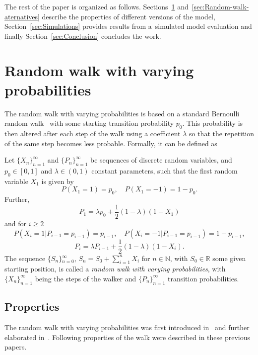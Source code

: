 The rest of the paper is organized as follows.
Sections~\ref{sec:Random-walk-with}
and~\ref{sec:Random-walk-aternatives}
describe the properties of different versions of the model,
Section~\ref{sec:Simulations} provides results from a~simulated
model evaluation and finally Section~\ref{sec:Conclusion} concludes
the work.


\section{Random walk with varying probabilities}\label{sec:Random-walk-with}

The random walk with varying probabilities is based on a standard
Bernoulli random walk~\cite{feller1957introduction} with some starting
transition probability $p_{0}$.
This probability is then altered
after each step of the walk using a coefficient $\lambda$ so that
the repetition of the same step becomes less probable.
Formally, it
can be defined as

\begin{definition}
\label{success_punished}
Let ${\{X_{n}\}}_{n=1}^{\infty}$ and ${\{P_{n}\}}_{n=1}^{\infty}$
be sequences of discrete random variables, and $p_{0}\in[0,1]$
and $\lambda\in(0,1)$ constant parameters, such that the first
random variable $X_{1}$ is given by
\[
P(X_{1}=1)=p_{0},\quad
P(X_{1}=-1)=1-p_{0}.
\]
Further,
\begin{equation}
P_{1}=\lambda p_{0}+\frac{1}{2}(1-\lambda)(1-X_{1})\label{eq:P!1_def}
\end{equation}
and for $i\geq2$
\[
P(X_{i}=1|P_{i-1}=p_{i-1})=p_{i-1},\quad
P(X_{i}=-1|P_{i-1}=p_{i-1})=1-p_{i-1},
\]
\begin{equation}
P_{i}=\lambda P_{i-1}+\frac{1}{2}(1-\lambda)(1-X_{i}).\label{eq:Pi_def}
\end{equation}
The sequence ${\{S_{n}\}}{}_{n=0}^{\infty}$, $S_{n}=S_{0}+\sum_{i=1}^{n}X_{i}$
for $n\in\mathbb{N}$, with $S_{0}\in\mathbb{R}$ some given starting
position, is called a \emph{random walk with varying probabilities},
with ${\{X_{n}\}}_{n=1}^{\infty}$ being the steps of the walker and
${\{P_{n}\}}_{n=1}^{\infty}$ transition probabilities.
\end{definition}

\subsection{Properties}\label{subsec:properties}
The random walk with varying probabilities was first introduced in~\cite{ja2017ddny} and further elaborated in~\cite{ja2019teze}.
Following properties of the walk were described in these previous
papers.


